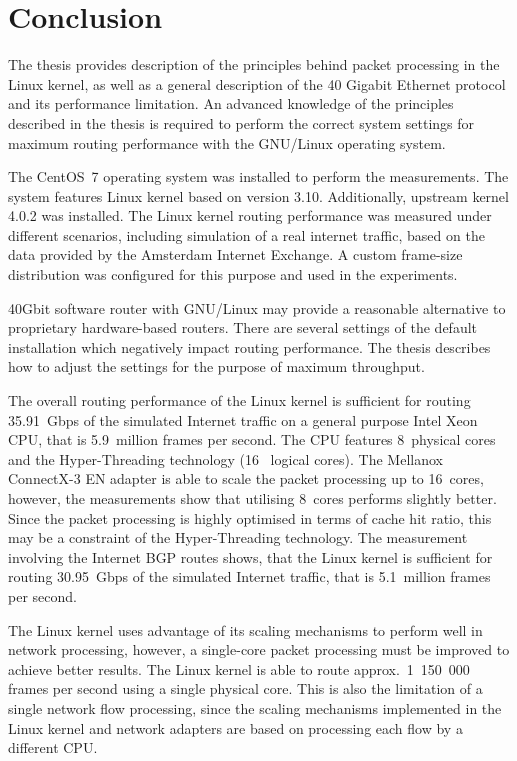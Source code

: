 
\chapter{Conclusion}\label{chap:conclusion}
The thesis provides description of the principles behind packet processing in the Linux kernel, as well as
a general description of the 40 Gigabit Ethernet protocol and its performance limitation.
An advanced knowledge of the principles described in the thesis is required to
perform the correct system settings for maximum routing performance with the GNU/Linux operating system.

The CentOS~7 operating system was installed to perform the measurements.
The system features Linux kernel based on version 3.10.
Additionally, upstream kernel 4.0.2 was installed.
The Linux kernel routing performance was measured under different scenarios, including
simulation of a real internet traffic, based on the data provided by the Amsterdam Internet Exchange.
A custom frame-size distribution was configured for this purpose and used in the experiments.

40Gbit software router with GNU/Linux may provide a reasonable alternative to proprietary hardware-based routers.
There are several settings of the default installation which negatively impact routing performance.
The thesis describes how to adjust the settings for the purpose of maximum throughput.

The overall routing performance of the Linux kernel is sufficient for routing 35.91~Gbps
of the simulated Internet traffic on a general purpose Intel Xeon CPU, that is 5.9~million frames per second.
The CPU features 8~physical cores and the Hyper-Threading technology (16~ logical cores).
The Mellanox ConnectX-3 EN adapter is able to scale the packet processing up to 16~cores,
however, the measurements show that utilising 8~cores performs slightly better.
Since the packet processing is highly optimised in terms of cache hit ratio,
this may be a constraint of the Hyper-Threading technology.
The measurement involving the Internet BGP routes shows,
that the Linux kernel is sufficient for routing 30.95~Gbps of the simulated Internet traffic,
that is 5.1~million frames per second.

The Linux kernel uses advantage of its scaling mechanisms to perform well in network processing,
however, a single-core packet processing must be improved to achieve better results.
The Linux kernel is able to route approx.~1~150~000
frames per second using a single physical core.
This is also the limitation of a single network flow processing,
since the scaling mechanisms implemented in the Linux kernel and network adapters
are based on processing each flow by a different CPU.

